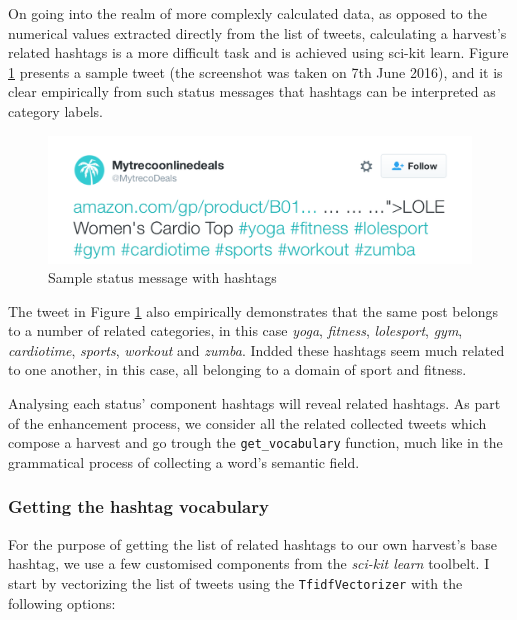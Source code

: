 On going into the realm of more complexly calculated data, as opposed to the numerical values extracted directly from the list of tweets, calculating a harvest's related hashtags is a more difficult task and is achieved using sci-kit learn. Figure \ref{fig:tweet} presents a sample tweet (the screenshot was taken on 7th June 2016), and it is clear empirically from such status messages that hashtags can be interpreted as category labels.

\begin{figure}[ht]
    \centering
\includegraphics[width=0.8\columnwidth]{img/tweet.png}
    \caption{Sample status message with hashtags}
    \label{fig:tweet}
\end{figure}

The tweet in Figure \ref{fig:tweet} also empirically demonstrates that the same post belongs to a number of related categories, in this case \emph{yoga}, \emph{fitness}, \emph{lolesport}, \emph{gym}, \emph{cardiotime}, \emph{sports}, \emph{workout} and \emph{zumba}. Indded these hashtags seem much related to one another, in this case, all belonging to a domain of sport and fitness.

Analysing each status' component hashtags will reveal related hashtags. As part of the enhancement process, we consider all the related collected tweets which compose a harvest and go trough the \texttt{get\_vocabulary} function, much like in the grammatical process of collecting a word's semantic field.

\subsubsection{Getting the hashtag vocabulary}
For the purpose of getting the list of related hashtags to our own harvest's base hashtag, we use a few customised components from the \emph{sci-kit learn} toolbelt. I start by vectorizing the list of tweets using the \texttt{TfidfVectorizer} with the following options:

